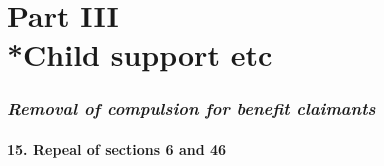 \documentclass[12pt,a4paper]{article}
\begin{document}
%
%
%
%
%
%
%
%
%

\part[Part III --- Child support etc]{Part III\\*Child support etc}

\renewcommand\parthead{--- Part III}

\section{\itshape Removal of compulsion for benefit claimants}

\subsection{15. Repeal of sections 6 and 46}
\end{document}

